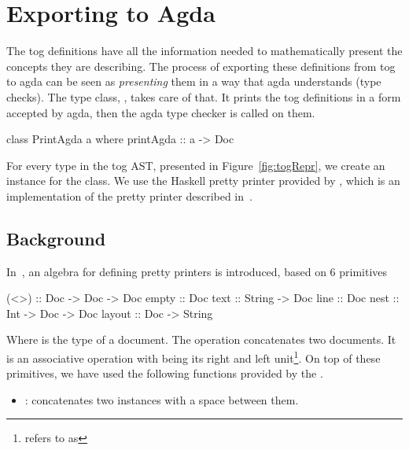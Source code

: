 \section{Exporting to Agda}
\label{sec:exporting_agda}
The tog definitions have all the information needed to mathematically present the concepts they are describing. The process of exporting these definitions from tog to agda can be seen as \emph{presenting} them in a way that agda understands (type checks). The type class, , takes care of that. It prints the tog definitions in a form accepted by agda, then the agda type checker is called on them. 
\begin{hscode}
class PrintAgda a where
  printAgda ::  a -> Doc   
\end{hscode}
For every type in the tog AST, presented in Figure~\ref{fig:togRepr}, we create an instance for the  class. 
We use the Haskell pretty printer provided by , which is an implementation of the pretty printer described in~\cite{wadler2003prettier}. 

\subsection{Background}
In~\cite{wadler2003prettier}, an algebra for defining pretty printers is introduced, based on $6$ primitives 
\begin{hscode}
(<>) :: Doc -> Doc -> Doc 
empty  :: Doc 
text :: String -> Doc 
line :: Doc 
nest :: Int -> Doc -> Doc 
layout :: Doc -> String 
\end{hscode}
Where  is the type of a document. The \lstmath{(<>)} operation concatenates two documents. It is an associative operation with  being its right and left unit\footnote{\cite{wadler2003prettier} refers to  as }. 
On top of these primitives, we have used the following functions provided by the 
. 
\begin{itemize}
\item \lstmath{(<+>)} : concatenates two  instances with a space between them. 
\end{itemize}

